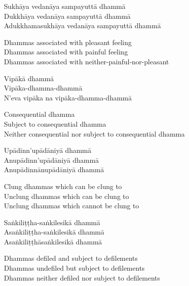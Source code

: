 \begin{pali-hang-continued}
  Sukhāya vedanāya sampayuttā dhammā\\
  Dukkhāya vedanāya sampayuttā dhammā\\
  Adukkhamasukhāya vedanāya sampayuttā dhammā
\end{pali-hang-continued}

\begin{english-verses}
  Dhammas associated with pleasant feeling\\
  Dhammas associated with painful feeling\\
  Dhammas associated with neither-painful-nor-pleasant
\end{english-verses}

\begin{pali-hang-continued}
  Vipākā dhammā\\
  Vipāka-dhamma-dhammā\\
  N'eva vipāka na vipāka-dhamma-dhammā
\end{pali-hang-continued}

\begin{english-verses}
  Consequential dhamma\\
  Subject to consequential dhamma\\
  Neither consequential nor subject to consequential dhamma
\end{english-verses}

\begin{pali-hang-continued}
  Upādinn'upādāniyā dhammā\\
  Anupādinn'upādāniyā dhammā\\
  Anupādinnānupādāniyā dhammā
\end{pali-hang-continued}

\begin{english-verses}
  Clung dhammas which can be clung to\\
  Unclung dhammas which can be clung to\\
  Unclung dhammas which cannot be clung to
\end{english-verses}

\begin{pali-hang-continued}
  Saṅkiliṭṭha-saṅkilesikā dhammā\\
  Asaṅkiliṭṭha-saṅkilesikā dhammā\\
  Asaṅkiliṭṭhāsaṅkilesikā dhammā
\end{pali-hang-continued}

\begin{english-verses}
  Dhammas defiled and subject to defilements\\
  Dhammas undefiled but subject to defilements\\
  Dhammas neither defiled nor subject to defilements
\end{english-verses}

